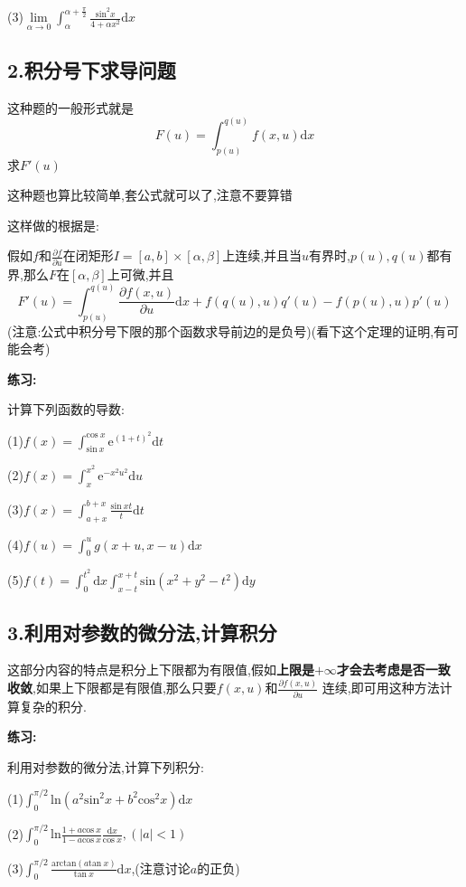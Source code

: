 \documentclass{ctexart}
\begin{document}
(3)$\lim\limits_{\alpha\rightarrow 0}\int_{\alpha}^{\alpha+\frac{\pi}{2}}\frac{\mathrm{sin}^{2}x}{4+\alpha x^{2}}\mathrm{d}x$

\subsection*{2.积分号下求导问题}

这种题的一般形式就是$$F(u)=\int_{p(u)}^{q(u)}f(x,u)\mathrm{d}x$$
求$F'(u)$

这种题也算比较简单,套公式就可以了,注意不要算错

这样做的根据是:

假如$f$和$\frac{\partial f}{\partial u}$在闭矩形$I=[a,b]\times[\alpha,\beta]$上连续,并且当$u$有界时,$p(u),q(u)$都有界,那么$F$在$[\alpha,\beta]$上可微,并且
$$F'(u)=\int_{p(u)}^{q(u)}\frac{\partial f(x,u)}{\partial u}\mathrm{d}x+f(q(u),u)q'(u)-f(p(u),u)p'(u)$$
(注意:公式中积分号下限的那个函数求导前边的是负号)(看下这个定理的证明,有可能会考)

\textbf{练习:}

计算下列函数的导数:

(1)$f(x)=\int_{\mathrm{sin}\ x}^{{\mathrm{cos}\ x}}\mathrm{e}^{(1+t)^{2}}\mathrm{d}t$

(2)$f(x)=\int_{x}^{x^{2}}\mathrm{e}^{-x^{2}u^{2}}\mathrm{d}u$

(3)$f(x)=\int_{a+x}^{b+x}\frac{\mathrm{sin}\ xt}{t}\mathrm{d}t$

(4)$f(u)=\int_{0}^{u}g(x+u,x-u)\mathrm{d}x$

(5)$f(t)=\int_{0}^{t^{2}}\mathrm{d}x\int_{x-t}^{x+t}\mathrm{sin}(x^{2}+y^{2}-t^{2})\mathrm{d}y$
\subsection*{3.利用对参数的微分法,计算积分}

这部分内容的特点是积分上下限都为有限值,假如\textbf{上限是}$+\infty$\textbf{才会去考虑是否一致收敛},如果上下限都是有限值,那么只要$f(x,u)$和$\frac{\partial f(x,u)}{\partial u}$ 连续,即可用这种方法计算复杂的积分.

\textbf{练习:}

利用对参数的微分法,计算下列积分:

(1)$\int_{0}^{\pi/2}\mathrm{ln}(a^{2}\mathrm{sin}^{2}x+b^{2}\mathrm{cos}^{2}x)\mathrm{d}x$

(2)$\int_{0}^{\pi/2}\mathrm{ln}\frac{1+a\mathrm{cos}\ x}{1-a\mathrm{cos}\ x}\frac{\mathrm{d}x}{\mathrm{cos}\ x},(|a|<1)$

(3)$\int_{0}^{\pi/2}\frac{\mathrm{arctan}(a\mathrm{tan}\ x)}{\mathrm{tan}\ x}\mathrm{d}x$,(注意讨论$a$的正负)
\end{document}

